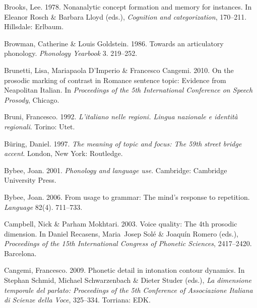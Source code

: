 \documentclass[ number=1
,series=labphon
,output=long
,url=http://langsci-press.org/catalog/book/16
,isbn=978-3-944675-01-5
]{LSP/langsci}
\begin{document}
\begin{thebibliography}{284}
Brooks, Lee. 1978.
\newblock Nonanalytic concept formation and memory for instances.
\newblock In Eleanor Rosch \& Barbara Lloyd (eds.), \emph{Cognition and
  categorization}, 170--211. Hillsdale: Erlbaum.

\enlargethispage{\baselineskip}
Browman, Catherine \& Louis Goldstein. 1986.
\newblock Towards an articulatory phonology.
\newblock \emph{Phonology Yearbook} 3. 219--252.

Brunetti, Lisa, Mariapaola D'Imperio \& Francesco Cangemi. 2010.
\newblock On the prosodic marking of contrast in {R}omance sentence topic:
  {E}vidence from {N}eapolitan {I}talian.
\newblock In \emph{Proceedings of the 5th {I}nternational {C}onference on
  {S}peech {P}rosody}, Chicago.

Bruni, Francesco. 1992.
\newblock \emph{L'italiano nelle regioni. {L}ingua nazionale e identità
  regionali}.
\newblock Torino: Utet.

B\"{u}ring, Daniel. 1997.
\newblock \emph{The meaning of topic and focus: {T}he 59th street bridge
  accent}.
\newblock London, New York: Routledge.

Bybee, Joan. 2001.
\newblock \emph{Phonology and language use}.
\newblock Cambridge: Cambridge University Press.

Bybee, Joan. 2006.
\newblock From usage to grammar: {T}he mind's response to repetition.
\newblock \emph{Language} 82(4). 711--733.

Campbell, Nick \& Parham Mokhtari. 2003.
\newblock Voice quality: {T}he 4th prosodic dimension.
\newblock In Daniel Recasens, Maria~Josep Sol\'{e} \& Joaquín Romero (eds.),
  \emph{Proceedings of the 15th {I}nternational {C}ongress of {P}honetic
  {S}ciences}, 2417--2420. Barcelona.

Cangemi, Francesco. 2009.
\newblock Phonetic detail in intonation contour dynamics.
\newblock In Stephan Schmid, Michael Schwarzenbach \& Dieter Studer (eds.),
  \emph{La dimensione temporale del parlato: {P}roceedings of the 5th
  {C}onference of {A}ssociazione {I}taliana di {S}cienze della {V}oce},
  325--334. Torriana: EDK.


\end{thebibliography}
\end{document}
